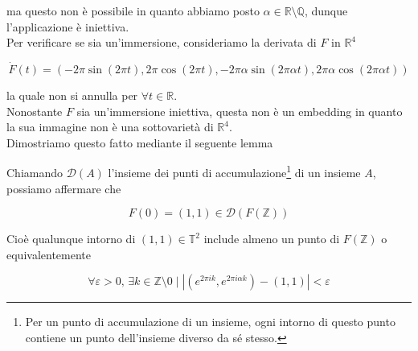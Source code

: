 ma questo non è possibile in quanto abbiamo posto $ \alpha \in \mathbb{R} \setminus \mathbb{Q} $, dunque l'applicazione è iniettiva.\\
Per verificare se sia un'immersione, consideriamo la derivata di $ F $ in $ \mathbb{R}^{4} $

\begin{equation}
	\dot{F}(t) = (- 2 \pi \sin(2 \pi t), 2 \pi \cos(2 \pi t), - 2 \pi \alpha \sin(2 \pi \alpha t), 2 \pi \alpha \cos(2 \pi \alpha t))
\end{equation}

la quale non si annulla per $ \forall t \in \mathbb{R} $.\\
Nonostante $ F $ sia un'immersione iniettiva, questa non è un embedding in quanto la sua immagine non è una sottovarietà di $ \mathbb{R}^{4} $.\\
Dimostriamo questo fatto mediante il seguente lemma


\begin{lemma}
	Chiamando $ \mathcal{D}(A) $ l'insieme dei punti di accumulazione\footnote{%
		Per un punto di accumulazione di un insieme, ogni intorno di questo punto contiene un punto dell'insieme diverso da sé stesso.%
	} di un insieme $ A $, possiamo affermare che
	
	\begin{equation}
		F(0) = (1,1) \in \mathcal{D}(F(\mathbb{Z}))
	\end{equation}

	Cioè qualunque intorno di $ (1,1) \in \mathbb{T}^{2} $ include almeno un punto di $ F(\mathbb{Z}) $ o equivalentemente
	
	\begin{equation}
		\forall \varepsilon > 0, \, \exists k \in \mathbb{Z} \setminus 0 \mid \left| (e^{2 \pi i k}, e^{2 \pi i \alpha k}) - (1,1) \right| < \varepsilon
	\end{equation}
\end{lemma}

